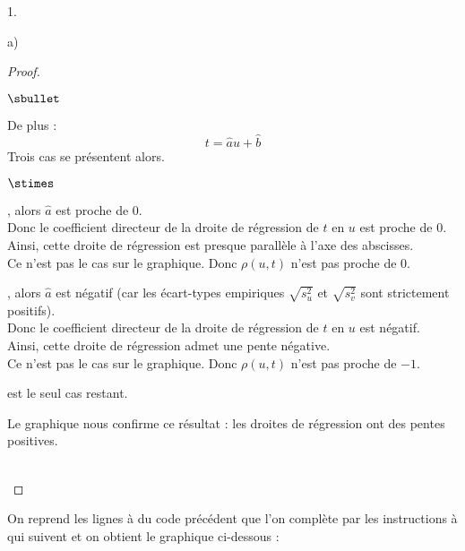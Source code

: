 \begin{noliste}{1.}
\begin{noliste}{a)}
\begin{proof}
\begin{noliste}{$\sbullet$}
    \item De plus :
    \[
     t = \hat{a} u + \hat{b}
    \]
    Trois cas se présentent alors.
    \begin{noliste}{$\stimes$}
      \item {}, alors
      $\hat{a}$ est proche de $0$.\\[.1cm]
      Donc le coefficient directeur de la droite de régression de $t$ 
      en $u$ est proche de $0$.\\
      Ainsi, cette droite de régression est presque parallèle à 
      l'axe des abscisses.\\
      Ce n'est pas le cas sur le graphique. Donc $\rho(u,t)$ 
      n'est pas proche de $0$.
      
      \item {}, alors
      $\hat{a}$ est négatif (car les écart-types empiriques
      $\sqrt{s_u^2}$ et $\sqrt{s_v^2}$ sont strictement positifs).\\
      Donc le coefficient directeur de la droite de régression de $t$ 
      en $u$ est négatif.\\
      Ainsi, cette droite de régression admet une pente négative.\\
      Ce n'est pas le cas sur le graphique. Donc $\rho(u,t)$ 
      n'est pas proche de $-1$.
      
      \item {} est le 
      seul cas restant.
    \end{noliste}
   \end{noliste}
   
   \begin{remarkL}{0.95}
     Le graphique nous confirme ce résultat : les droites 
     de régression ont des pentes positives.
   \end{remarkL}~\\[-1.4cm]
  \end{proof}
  
  
  
  
  \newpage
  

  
  \item On reprend les lignes  à 
   du code précédent que l'on complète par les 
  instructions  à  
  qui suivent et on obtient le graphique ci-dessous :
  

\end{noliste}
\end{noliste}
